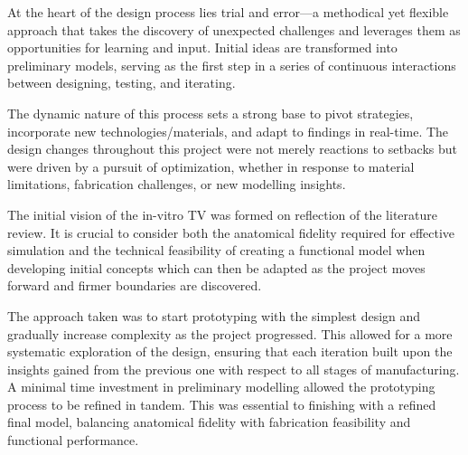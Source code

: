 At the heart of the design process lies trial and error—a methodical yet flexible approach that takes the discovery of unexpected challenges and leverages them as opportunities for learning and input. Initial ideas are transformed into preliminary models, serving as the first step in a series of continuous interactions between designing, testing, and iterating.

The dynamic nature of this process sets a strong base to pivot strategies, incorporate new technologies/materials, and adapt to findings in real-time. The design changes throughout this project were not merely reactions to setbacks but were driven by a pursuit of optimization, whether in response to material limitations, fabrication challenges, or new modelling insights.


\mynewline
The initial vision of the in-vitro \gls{TV} was formed on reflection of the literature review. It is crucial to consider both the anatomical fidelity required for effective simulation and the technical feasibility of creating a functional model when developing initial concepts which can then be adapted as the project moves forward and firmer boundaries are discovered.

The approach taken was to start prototyping with the simplest design and gradually increase complexity as the project progressed. This allowed for a more systematic exploration of the design, ensuring that each iteration built upon the insights gained from the previous one with respect to all stages of manufacturing. A minimal time investment in preliminary modelling allowed the prototyping process to be refined in tandem. This was essential to finishing with a refined final model, balancing anatomical fidelity with fabrication feasibility and functional performance.

